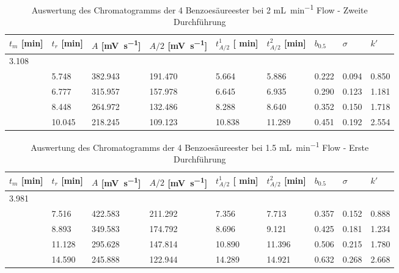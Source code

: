 \documentclass{article}
\begin{document}
 \begin{table}[ht!]
  \centering
 \begin{tabularx}{\textwidth}{XXXXXXXXX}
 $t_m $ [\si{\minute}] & $t_r$ [\si{\minute}] & $A$ [\si{\milli\volt\per\second}] & $A/2$ [\si{\milli\volt\per\second}] & $t_{A/2}^1$ [ \si{\minute}] & $t_{A/2}^2$  [\si{\minute}] &
 $b_{0.5}$ & $\sigma$ & $k'$\\
\hline
3.108 &&&&&&&& \\
 & 5.748 & 382.943 &191.470 &5.664&5.886 &    0.222  & 0.094 & 0.850 \\
 &6.777 & 315.957  &157.978 & 6.645 &6.935  & 0.290  & 0.123 & 1.181\\
  &8.448 & 264.972 &132.486 & 8.288 & 8.640 & 0.352& 0.150&    1.718\\
  &10.045& 218.245 &109.123 &10.838 &11.289 & 0.451& 0.192 &   2.554
\end{tabularx}
   \renewcommand\thetable{3}
  \caption{Auswertung des Chromatogramms der 4 Benzoesäureester bei 2 \si{\milli\liter\per\minute} Flow - Zweite Durchführung}
\end{table}
\newpage
 \begin{table}[ht!]
  \centering
 \begin{tabularx}{\textwidth}{XXXXXXXXX}
 $t_m $ [\si{\minute}] & $t_r$ [\si{\minute}] & $A$ [\si{\milli\volt\per\second}] & $A/2$ [\si{\milli\volt\per\second}] & $t_{A/2}^1$ [ \si{\minute}] & $t_{A/2}^2$  [\si{\minute}] &
 $b_{0.5}$ & $\sigma$ & $k'$\\
\hline
3.981&&&&&&&& \\
& 7.516 & 422.583  &211.292   & 7.356  &7.713   &0.357&0.152& 0.888\\
& 8.893 & 349.583  & 174.792  & 8.696  &9.121   &0.425&0.181& 1.234\\
& 11.128 & 295.628 &  147.814 & 10.890 & 11.396 &0.506&0.215& 1.780\\
& 14.590 & 245.888 & 122.944  & 14.289 & 14.921 &0.632&0.268& 2.668 \\
\end{tabularx}
   \renewcommand\thetable{4}

  \caption{Auswertung des Chromatogramms der 4 Benzoesäureester bei 1.5 \si{\milli\liter\per\minute} Flow - Erste Durchführung}
\end{table}
\end{document}
